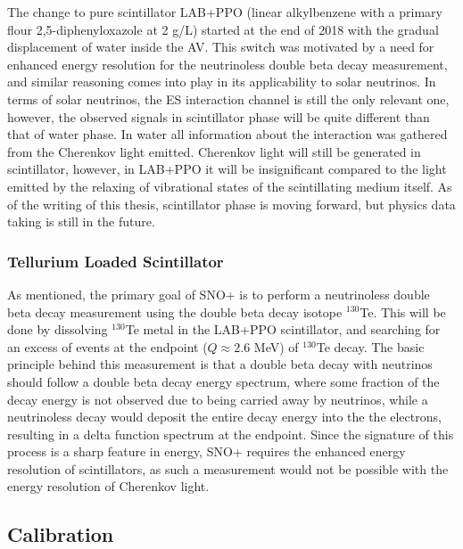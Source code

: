 The change to pure scintillator LAB+PPO (linear alkylbenzene with a primary flour 2,5-diphenyloxazole at 2 g/L) started at the end of 2018 with the gradual displacement of water inside the AV.
This switch was motivated by a need for enhanced energy resolution for the neutrinoless double beta decay measurement, and similar reasoning comes into play in its applicability to solar neutrinos.
In terms of solar neutrinos, the ES interaction channel is still the only relevant one, however, the observed signals in scintillator phase will be quite different than that of water phase.
In water all information about the interaction was gathered from the Cherenkov light emitted. 
Cherenkov light will still be generated in scintillator, however, in LAB+PPO it will be insignificant compared to the light emitted by the relaxing of vibrational states of the scintillating medium itself.
As of the writing of this thesis, scintillator phase is moving forward, but physics data taking is still in the future.

\subsubsection{Tellurium Loaded Scintillator}
As mentioned, the primary goal of SNO+ is to perform a neutrinoless double beta decay measurement using the double beta decay isotope $^{130}$Te.
This will be done by dissolving $^{130}$Te metal in the LAB+PPO scintillator, and searching for an excess of events at the endpoint ($Q \approx 2.6$ MeV) of $^{130}$Te decay.
The basic principle behind this measurement is that a double beta decay with neutrinos should follow a double beta decay energy spectrum, where some fraction of the decay energy is not observed due to being carried away by neutrinos, while a neutrinoless decay would deposit the entire decay energy into the the electrons, resulting in a delta function spectrum at the endpoint.
Since the signature of this process is a sharp feature in energy, SNO+ requires the enhanced energy resolution of scintillators, as such a measurement would not be possible with the energy resolution of Cherenkov light.

\subsection{Calibration}

